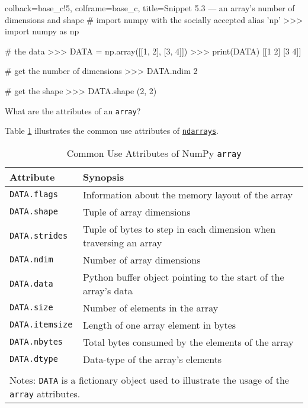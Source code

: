\documentclass[a4paper,11pt]{book}
\numberwithin{figure}{chapter}
\numberwithin{table}{chapter}
\newcommand{\question}[1]{%
    \begin{tcolorbox}[colback=comp_c!10,colframe=comp_c,sidebyside align=top,width=\linewidth,before skip=1ex]
        #1
    \end{tcolorbox}
    \switchcolumn%
}
\newcommand{\note}[1]{%
    \begin{tcolorbox}[colback=white!0,colframe=white!10,width=\linewidth,before skip=1ex]
        #1
    \end{tcolorbox}
}
\begin{document}
\begin{pythoncode}[linenos=true,]{colback=base_c!5, colframe=base_c, title=\sffamily Snippet 5.3 --- an array's number of dimensions and shape}
# import numpy with the socially accepted alias 'np'
>>> import numpy as np

# the data
>>> DATA = np.array([[1, 2], [3, 4]])
>>> print(DATA)
[[1 2]
 [3 4]]

# get the number of dimensions
>>> DATA.ndim 
2

# get the shape
>>> DATA.shape
(2, 2)
\end{pythoncode}

\begin{paracol}{2}
	\question{\raggedright What are the attributes of an \texttt{array}?}
	\note{Table \ref{tab:array_attributes} illustrates the common use attributes of \href{https://numpy.org/doc/stable/reference/arrays.ndarray.html}{\texttt{ndarrays}}.}
\end{paracol}

\begin{table}[!htbp]
	\centering
	\caption{Common Use Attributes of NumPy \texttt{array}}
	\label{tab:array_attributes}
	\begin{tabular}{ll}
		\toprule \toprule
			Attribute & Synopsis \\
			\midrule 
                        \texttt{DATA.flags} &
                        Information about the memory layout of the array \\
                        \texttt{DATA.shape} &
                        Tuple of array dimensions\\
                        \texttt{DATA.strides}&
                        Tuple of bytes to step in each dimension when traversing an array\\
                        \texttt{DATA.ndim}&
                        Number of array dimensions\\
                        \texttt{DATA.data}&
                        Python buffer object pointing to the start of the array's data\\
                        \texttt{DATA.size}&
                        Number of elements in the array\\
                        \texttt{DATA.itemsize}&
                        Length of one array element in bytes\\
                        \texttt{DATA.nbytes}&
                        Total bytes consumed by the elements of the array\\
			\texttt{DATA.dtype}&
			Data-type of the array's elements\\
     			\bottomrule \\[-1.8ex]
			\multicolumn{2}{l}{Notes: \texttt{DATA} is a fictionary object used to illustrate the usage of the \texttt{array} attributes.} \\
	\end{tabular}
\end{table}
\clearpage 
\end{document}
